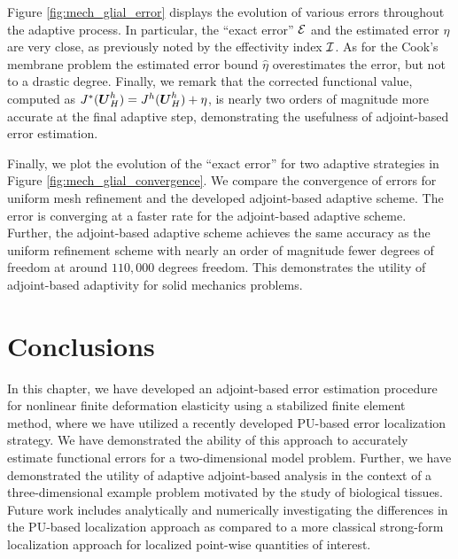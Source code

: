 Figure \ref{fig:mech_glial_error} displays the evolution of various errors
throughout the adaptive process. In particular, the ``exact error'' $\mathcal{E}$ and
the estimated error $\eta$ are very close, as previously noted by the
effectivity index $\mathcal{I}$. As for the Cook's membrane problem the estimated error
bound $\hat{\eta}$ overestimates the error, but not to a drastic degree.
Finally, we remark that the corrected functional value, computed as
$J^*(\boldsymbol{U}^h_H) = J^h(\boldsymbol{U}^h_H) + \eta$, is nearly two orders of magnitude
more accurate at the final adaptive step, demonstrating the usefulness
of adjoint-based error estimation.

Finally, we plot the evolution of the ``exact error'' for two adaptive
strategies in Figure \ref{fig:mech_glial_convergence}. We compare the
convergence of errors for uniform mesh refinement and the developed
adjoint-based adaptive scheme. The error is converging at a faster rate for
the adjoint-based adaptive scheme. Further, the adjoint-based adaptive scheme
achieves the same accuracy as the uniform refinement scheme with nearly an
order of magnitude fewer degrees of freedom at around $110,000$ degrees
freedom. This demonstrates the utility of adjoint-based adaptivity for solid
mechanics problems.

\section{Conclusions}

In this chapter, we have developed an adjoint-based error estimation
procedure for nonlinear finite deformation elasticity using a stabilized
finite element method, where we have utilized a recently developed PU-based
error localization strategy. We have demonstrated the ability of this approach
to accurately estimate functional errors for a two-dimensional model
problem. Further, we have demonstrated the utility of adaptive adjoint-based
analysis in the context of a three-dimensional example problem motivated
by the study of biological tissues. Future work includes analytically and
numerically investigating the differences in the PU-based localization
approach as compared to a more classical strong-form localization approach
for localized point-wise quantities of interest.
